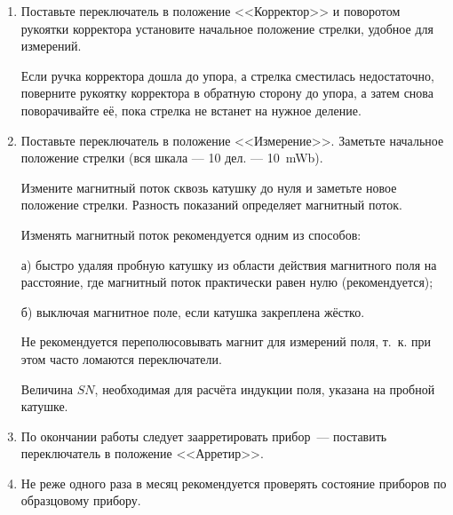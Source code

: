 
\begin{enumerate}

\item{Поставьте переключатель в положение <<Корректор>> и поворотом рукоятки корректора установите начальное положение стрелки, удобное для измерений.

Если ручка корректора дошла до упора, а стрелка сместилась недостаточно, поверните рукоятку корректора в обратную сторону до упора, а затем снова поворачивайте её, пока стрелка не встанет на нужное деление.}

\item{Поставьте переключатель в положение <<Измерение>>. Заметьте начальное положение стрелки (вся шкала --- 10 дел. --- 10~mWb).

Измените магнитный поток сквозь катушку до нуля и заметьте новое положение стрелки. Разность показаний определяет магнитный поток.

Изменять магнитный поток рекомендуется одним из способов:

а) быстро удаляя пробную катушку из области действия магнитного поля на расстояние, где магнитный поток практически равен нулю (рекомендуется);

б) выключая магнитное поле, если катушка закреплена жёстко.

Не рекомендуется переполюсовывать магнит для измерений поля, т.~к. при этом часто ломаются переключатели.

Величина $SN$, необходимая для расчёта индукции поля, указана на пробной катушке.}

\item{По окончании работы следует заарретировать прибор~--- поставить переключатель в положение <<Арретир>>.}

\item{Не реже одного раза в месяц рекомендуется проверять состояние приборов по образцовому прибору.}


\end{enumerate}
